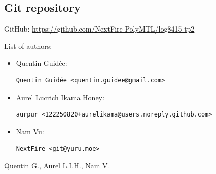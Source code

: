 \documentclass[letterpaper,headings=standardclasses,parskip=half]{scrartcl}
\begin{document}

\subsection*{Git repository}

GitHub: \url{https://github.com/NextFire-PolyMTL/log8415-tp2}

List of authors:

\begin{itemize}
    \item Quentin Guidée:
          \begin{lstlisting}
Quentin Guidée <quentin.guidee@gmail.com>
\end{lstlisting}
    \item Aurel Lucrich Ikama Honey:
          \begin{lstlisting}
aurpur <122250820+aurelikama@users.noreply.github.com>
\end{lstlisting}
    \item Nam Vu:
          \begin{lstlisting}
NextFire <git@yuru.moe>
\end{lstlisting}
\end{itemize}


Quentin G., Aurel L.I.H., Nam V.

\end{document}
